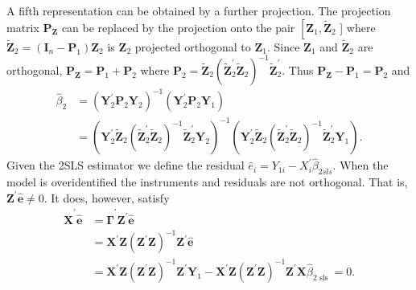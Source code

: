 \documentclass[10pt]{article}
\begin{document}
A fifth representation can be obtained by a further projection. The projection matrix $\boldsymbol{P}_{\boldsymbol{Z}}$ can be replaced by the projection onto the pair $\left[\boldsymbol{Z}_{1}, \widetilde{\boldsymbol{Z}}_{2}\right.$ ] where $\widetilde{\boldsymbol{Z}}_{2}=\left(\boldsymbol{I}_{n}-\boldsymbol{P}_{1}\right) \boldsymbol{Z}_{2}$ is $\boldsymbol{Z}_{2}$ projected orthogonal to $\boldsymbol{Z}_{1}$. Since $\boldsymbol{Z}_{1}$ and $\widetilde{\boldsymbol{Z}}_{2}$ are orthogonal, $\boldsymbol{P}_{\boldsymbol{Z}}=\boldsymbol{P}_{1}+\boldsymbol{P}_{2}$ where $\boldsymbol{P}_{2}=\widetilde{\boldsymbol{Z}}_{2}\left(\widetilde{\boldsymbol{Z}}_{2}^{\prime} \widetilde{\boldsymbol{Z}}_{2}\right)^{-1} \widetilde{\boldsymbol{Z}}_{2}^{\prime}$. Thus $\boldsymbol{P}_{\boldsymbol{Z}}-\boldsymbol{P}_{1}=\boldsymbol{P}_{2}$ and
$$
\begin{aligned}
\widehat{\beta}_{2} &=\left(\boldsymbol{Y}_{2}^{\prime} \boldsymbol{P}_{2} \boldsymbol{Y}_{2}\right)^{-1}\left(\boldsymbol{Y}_{2}^{\prime} \boldsymbol{P}_{2} \boldsymbol{Y}_{1}\right) \\
&=\left(\boldsymbol{Y}_{2}^{\prime} \widetilde{\boldsymbol{Z}}_{2}\left(\widetilde{\boldsymbol{Z}}_{2}^{\prime} \widetilde{\boldsymbol{Z}}_{2}\right)^{-1} \widetilde{\boldsymbol{Z}}_{2}^{\prime} \boldsymbol{Y}_{2}\right)^{-1}\left(\boldsymbol{Y}_{2}^{\prime} \widetilde{\boldsymbol{Z}}_{2}\left(\widetilde{\boldsymbol{Z}}_{2}^{\prime} \widetilde{\boldsymbol{Z}}_{2}\right)^{-1} \widetilde{\boldsymbol{Z}}_{2}^{\prime} \boldsymbol{Y}_{1}\right) .
\end{aligned}
$$
Given the 2SLS estimator we define the residual $\widehat{e}_{i}=Y_{1 i}-X_{i}^{\prime} \widehat{\beta}_{2 s l s}$. When the model is overidentified the instruments and residuals are not orthogonal. That is, $\boldsymbol{Z}^{\prime} \widehat{\boldsymbol{e}} \neq 0$. It does, however, satisfy
$$
\begin{aligned}
\widehat{\boldsymbol{X}}^{\prime} \widehat{\boldsymbol{e}} &=\widehat{\boldsymbol{\Gamma}}^{\prime} \boldsymbol{Z}^{\prime} \widehat{\boldsymbol{e}} \\
&=\boldsymbol{X}^{\prime} \boldsymbol{Z}\left(\boldsymbol{Z}^{\prime} \boldsymbol{Z}\right)^{-1} \boldsymbol{Z}^{\prime} \widehat{\boldsymbol{e}} \\
&=\boldsymbol{X}^{\prime} \boldsymbol{Z}\left(\boldsymbol{Z}^{\prime} \boldsymbol{Z}\right)^{-1} \boldsymbol{Z}^{\prime} \boldsymbol{Y}_{1}-\boldsymbol{X}^{\prime} \boldsymbol{Z}\left(\boldsymbol{Z}^{\prime} \boldsymbol{Z}\right)^{-1} \boldsymbol{Z}^{\prime} \boldsymbol{X} \widehat{\beta}_{2 \text { sls }}=0 .
\end{aligned}
$$
\end{document}

